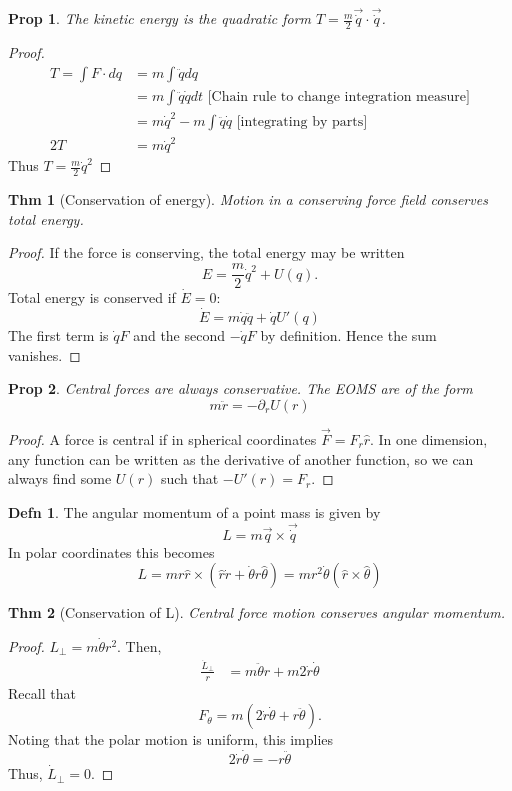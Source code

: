 \documentclass{article}
\newtheorem*{theorem}{Thm}
\newtheorem*{proposition}{Prop}
\theoremstyle{definition}
\newtheorem*{definition}{Defn}
\theoremstyle{remark}
\begin{document}
\begin{proposition}
  The kinetic energy is the quadratic form $T=\frac{m}{2}\vec{\dot q}\cdot\vec{\dot q}$.
\end{proposition}

\begin{proof}
  \begin{align*}
    T =\int F\cdot dq&=m\int \ddot q dq\\
    &= m\int \ddot q \dot q dt\text{ [Chain rule to change integration measure]}\\
    &=m\dot q^2-m\int \ddot q\dot q\text{ [integrating by parts]}\\
    2T&=m\dot q^2
  \end{align*}
  Thus $T=\frac{m}{2}\dot q^2$
\end{proof}

\begin{theorem}[Conservation of energy]
Motion in a conserving force field conserves total energy.  
\end{theorem}
\begin{proof}
  If the force is conserving, the total energy may be written
  $$
  E = \frac{m}{2}\dot q^2+U(q).
  $$
  Total energy is conserved if $\dot E=0$:
  $$
  \dot E = m \dot q\ddot q+\dot q U'(q)
  $$
  The first term is $\dot q F$ and the second $-\dot q F$ by definition. Hence the sum vanishes.
\end{proof}

\begin{proposition}
  Central forces are always conservative. The EOMS are of the form 
  $$
  m\ddot r = -\partial_r U(r)
  $$
\end{proposition}
\begin{proof}
  A force is central if in spherical coordinates $\vec F =F_r\hat r$. In one dimension, any function can be written as the derivative of another function, so we can always find some $U(r)$ such that $-U'(r)=F_r$.
\end{proof}

\begin{definition}
  The angular momentum of a point mass is given by 
  $$
  L=m\vec q \times \vec {\dot q}
  $$
  In polar coordinates this becomes 
$$
L=mr\hat r\times (\hat r \dot r+\dot \theta r \hat \theta)=mr^2\dot \theta(\hat r\times \hat \theta)
$$
\end{definition}

\begin{theorem}[Conservation of L] Central force motion conserves angular momentum. 
  
\end{theorem}
\begin{proof}
  $L_\perp = m\dot \theta r^2$. Then,
  \begin{align*}
    \frac{\dot L_\perp}{r}&=m\ddot \theta r+m2\dot r\dot \theta
  \end{align*}
  Recall that 
  $$
F_\theta=m(2\dot r \dot \theta +r\ddot \theta).
  $$
  Noting that the polar motion is uniform, this implies
  $$
2\dot r \dot \theta =-r\ddot \theta
  $$
  Thus, $\dot L_\perp=0$.
\end{proof}
\end{document}
